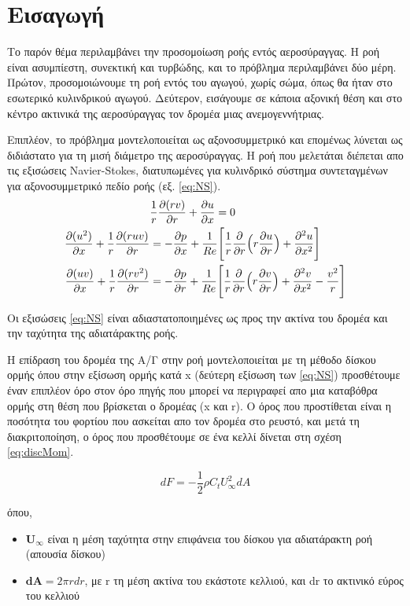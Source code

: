 \section*{Εισαγωγή}

Το παρόν θέμα περιλαμβάνει την προσομοίωση ροής εντός αεροσύραγγας. Η ροή είναι ασυμπίεστη, συνεκτική και τυρβώδης, και το πρόβλημα περιλαμβάνει δύο μέρη. Πρώτον, προσομοιώνουμε τη ροή εντός του αγωγού, χωρίς σώμα, όπως θα ήταν στο εσωτερικό κυλινδρικού αγωγού. Δεύτερον, εισάγουμε σε κάποια αξονική θέση και στο κέντρο ακτινικά της αεροσύραγγας τον δρομέα μιας ανεμογεννήτριας. 

Επιπλέον, το πρόβλημα μοντελοποιείται ως αξονοσυμμετρικό και επομένως λύνεται ως διδιάστατο για τη μισή διάμετρο της αεροσύραγγας.
Η ροή που μελετάται διέπεται απο τις εξισώσεις Navier-Stokes, διατυπωμένες για κυλινδρικό σύστημα συντεταγμένων για αξονοσυμμετρικό πεδίο ροής (εξ. \ref{eq:NS}).
\begin{equation}
    \begin{aligned}
        &\dfrac{1}{r}\dfrac{\partial(rv)}{\partial r} + \dfrac{\partial u}{\partial x} = 0\\ 
        \dfrac{\partial (u^2)}{\partial x}+\dfrac{1}{r}\dfrac{\partial (ruv)}{\partial r} &= -\dfrac{\partial p}{\partial x} + \dfrac{1}{Re}\Bigg[\dfrac{1}{r}\dfrac{\partial }{\partial r}\Big(r\dfrac{\partial u}{\partial r}\Big) + \dfrac{\partial ^2u}{\partial x^2}\Bigg]\\
        \dfrac{\partial (uv)}{\partial x}+\dfrac{1}{r}\dfrac{\partial (rv^2)}{\partial r}&=-\dfrac{\partial p}{\partial r}+\dfrac{1}{Re}\Bigg[\dfrac{1}{r}\dfrac{\partial }{\partial r}\Big(r\dfrac{\partial v}{\partial r}\Big)+\dfrac{\partial ^2v}{\partial x^2}-\dfrac{v^2}{r}\Bigg] 
    \end{aligned}
    \label{eq:NS}
\end{equation}

Οι εξισώσεις \ref{eq:NS} είναι αδιαστατοποιημένες ως προς την ακτίνα του δρομέα και την ταχύτητα της αδιατάρακτης ροής.

Η επίδραση του δρομέα της Α/Γ στην ροή μοντελοποιείται με τη μέθοδο δίσκου ορμής όπου στην εξίσωση ορμής κατά x (δεύτερη εξίσωση των \ref{eq:NS}) προσθέτουμε έναν επιπλέον όρο στον όρο πηγής που μπορεί να περιγραφεί απο μια καταβόθρα ορμής στη θέση που βρίσκεται ο δρομέας (x και r). Ο όρος που προστίθεται είναι η ποσότητα του φορτίου που ασκείται απο τον δρομέα στο ρευστό, και μετά τη διακριτοποίηση, ο όρος που προσθέτουμε σε ένα κελλί δίνεται στη σχέση \ref{eq:discMom}.

\begin{equation}
    dF = -\dfrac{1}{2}\rho C_tU^2_{\infty}dA 
    \label{eq:discMom}
\end{equation}

όπου,
\begin{itemize}
    \item $\mathbf{U_{\infty}}$ είναι η μέση ταχύτητα στην επιφάνεια του δίσκου για αδιατάρακτη ροή (απουσία δίσκου)
    \item $\mathbf{dA} = 2\pi rdr$, με r τη μέση ακτίνα του εκάστοτε κελλιού, και dr το ακτινικό εύρος του κελλιού
\end{itemize}
